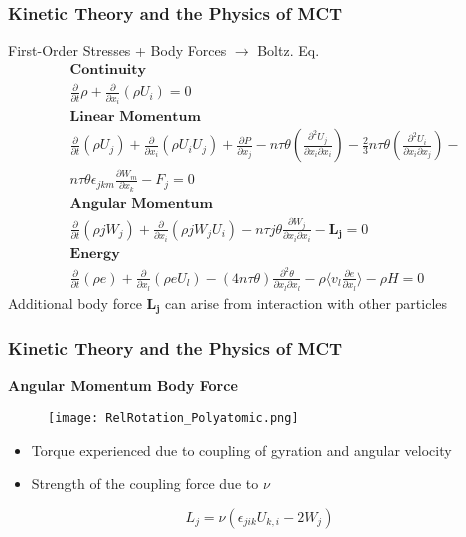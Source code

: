 \documentclass{beamer}
\begin{document}
\begin{frame}
 \frametitle{Kinetic Theory and the Physics of MCT}
First-Order Stresses + Body Forces $\rightarrow$ Boltz. Eq.
\pause
\footnotesize
 \begin{align*}
&\textbf{Continuity} \nonumber \\ 
&\frac{\partial }{\partial t}\rho + \frac{\partial }{\partial x_i}(\rho U_i) = 
0 \\
&\textbf{Linear Momentum} \nonumber \\ 
&\frac{\partial}{\partial t}(\rho U_j)  + \frac{\partial}{\partial x_i}(\rho 
U_iU_j) + \frac{\partial P}{\partial x_j} - n\tau\theta (\frac{\partial^2 
U_j}{\partial x_i \partial x_i}) - \frac{2}{3}n\tau\theta(\frac{\partial^2 
U_i}{\partial x_i \partial x_j}) - 
\\ 
& n\tau\theta\epsilon_{jkm}\frac{\partial W_m}{\partial x_k} - F_{j}= 0 
\nonumber \\
&\textbf{Angular Momentum} \nonumber \\ 
&\frac{\partial}{\partial t}(\rho j W_j) + 
\frac{\partial}{\partial x_{i}}(\rho jW_jU_i) - 
n\tau j\theta \frac{\partial W_j}{\partial x_i \partial x_i} - \bm{L_{j}} = 
0 
\nonumber\\
&\textbf{Energy} \\
&\frac{\partial}{\partial t}(\rho e) + \frac{\partial}{\partial 
x_{l}}(\rho eU_l)   - (4n\tau\theta)\frac{\partial^2 \theta}{\partial 
x_{l}\partial x_l} - \rho \langle v_{l}\frac{\partial e}{\partial x_{l}}
\rangle - \rho H = 0 
\end{align*}
\pause
Additional body force $\bm{L_{j}}$ can arise from interaction with other 
particles
\end{frame}

\begin{frame}
\frametitle{Kinetic Theory and the Physics of MCT}
 \textbf{\large Angular Momentum Body Force}
 \begin{multicols}{2}
  \begin{figure}
  \centering
   \texttt{[image: RelRotation\_Polyatomic.png]}
  \end{figure}
  \centering 
  \Large
  \begin{itemize}
  \item Torque experienced due to coupling of gyration and angular velocity\\
  \item Strength of the coupling force due to $\nu$ \\
  \end{itemize}
   $$ L_{j} = \nu(\epsilon_{jik}U_{k,i} - 2W_{j})$$
 \end{multicols}

\end{frame}
\end{document}

